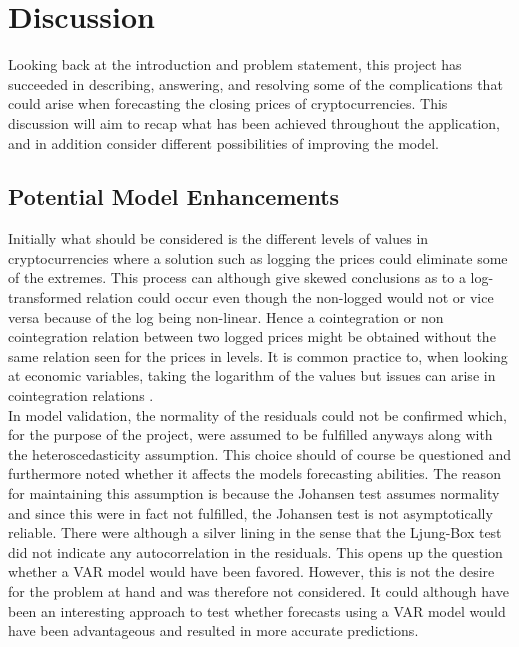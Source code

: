 \chapter{Discussion}
Looking back at the introduction and problem statement, this project has succeeded in describing, answering, and resolving some of the complications that could arise when forecasting the closing prices of cryptocurrencies. This discussion will aim to recap what has been achieved throughout the application, and in addition consider different possibilities of improving the model.

\section{Potential Model Enhancements}
Initially what should be considered is the different levels of values in cryptocurrencies where a solution such as logging the prices could eliminate some of the extremes. This process can although give skewed conclusions as to a log-transformed relation could occur even though the non-logged would not or vice versa because of the log being non-linear. Hence a cointegration or non cointegration relation between two logged prices might be obtained without the same relation seen for the prices in levels. It is common practice to, when looking at economic variables, taking the logarithm of the values but issues can arise in cointegration relations \cite{cointegrationloggedissues}.\\

\noindent In model validation, the normality of the residuals could not be confirmed which, for the purpose of the project, were assumed to be fulfilled anyways along with the heteroscedasticity assumption. This choice should of course be questioned and furthermore noted whether it affects the models forecasting abilities. The reason for maintaining this assumption is because the Johansen test assumes normality and since this were in fact not fulfilled, the Johansen test is not asymptotically reliable. There were although a silver lining in the sense that the Ljung-Box test did not indicate any autocorrelation in the residuals. This opens up the question whether a VAR model would have been favored. However, this is not the desire for the problem at hand and was therefore not considered. It could although have been an interesting approach to test whether forecasts using a VAR model would have been advantageous and resulted in more accurate predictions.\\

